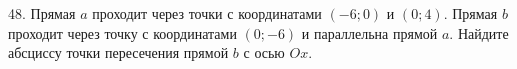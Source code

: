 48. Прямая $a$ проходит через точки с координатами $(-6;0)$ и $(0;4).$ Прямая $b$ проходит через точку с координатами $(0;-6)$ и параллельна прямой $a.$ Найдите абсциссу точки пересечения прямой $b$ с осью $Ox.$\\
